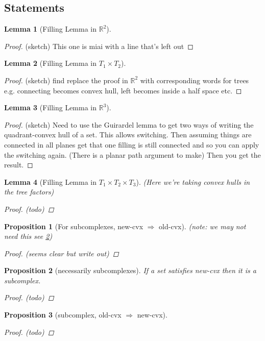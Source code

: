 \documentclass{article}
\theoremstyle{mystyle}
\newtheorem{lem}{Lemma}[section]
\newtheorem{pro}{Proposition}
\theoremstyle{remark}
\begin{document}
\subsection{Statements}

\begin{lem}
    [Filling Lemma in \(\mathbb{R}^{2}\)]
\end{lem}
\begin{proof}
    (sketch) This one is miai with a line that's left out
\end{proof}
\begin{lem}
    [Filling Lemma in \(T_{1} \times T_{2}\)]
\end{lem}
\begin{proof}
    (sketch) find replace the proof in \(\mathbb{R}^{2}\) with corresponding words for trees e.g. connecting becomes convex hull, left becomes inside a half space etc.
\end{proof}
\begin{lem}
    [Filling Lemma in \(\mathbb{R}^{3}\)]
\end{lem}
\begin{proof}
    (sketch) Need to use the Guirardel lemma to get two ways of writing the quadrant-convex hull of a set. This allows switching. Then assuming things are connected in all planes get that one filling is still connected and so you can apply the switching again. (There is a planar path argument to make) Then you get the result.
\end{proof}
\begin{lem}
    [Filling Lemma in \(T_{1} \times T_{2} \times T_{3}\)]
    (Here we're taking convex hulls in the tree factors)
\begin{proof}
    (todo)
\end{proof}
\end{lem}
\begin{pro}
    [For subcomplexes, new-cvx \(\Longrightarrow\) old-cvx]
    (note: we may not need this see \ref{label1})
    \begin{proof}
        (seems clear but write out)
    \end{proof}
\end{pro}
\begin{pro}
    [necessarily subcomplexes]
    \label{label1}
    If a set satisfies new-cvx then it is a subcomplex.
    \begin{proof}
        (todo)
    \end{proof}
\end{pro}
\begin{pro}
    [subcomplex, old-cvx \(\Longrightarrow\) new-cvx]
    \begin{proof}
        (todo)
    \end{proof}
\end{pro}
\end{document}
